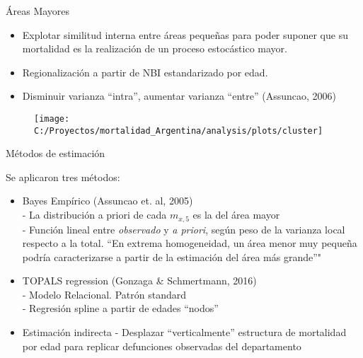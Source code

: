 \documentclass[10pt,ignorenonframetext,]{beamer}
\providecommand{\tightlist}{%
  \setlength{\itemsep}{0pt}\setlength{\parskip}{0pt}}
\begin{document}
\begin{frame}{Áreas Mayores}

\begin{itemize}[<+->]
\tightlist
\item
  Explotar similitud interna entre áreas pequeñas para poder suponer que
  su mortalidad es la realización de un proceso estocástico mayor.
\item
  Regionalización a partir de NBI estandarizado por edad.
\item
  Disminuir varianza ``intra'', aumentar varianza ``entre'' (Assuncao,
  2006)
\end{itemize}

\pause

\begin{figure}

{\centering \texttt{[image: C:/Proyectos/mortalidad\_Argentina/analysis/plots/cluster]} 

}

\end{figure}

\end{frame}

\begin{frame}{Métodos de estimación}

Se aplicaron tres métodos:

\begin{itemize}[<+->]
\tightlist
\item
  Bayes Empírico (Assuncao et. al, 2005)\\
  - La distribución a priori de cada \(m_{x,5}\) es la del área mayor\\
  - Función lineal entre \emph{observado} y \emph{a priori}, según peso
  de la varianza local respecto a la total. ``En extrema homogeneidad,
  un área menor muy pequeña podría caracterizarse a partir de la
  estimación del área más grande''"\\
\item
  TOPALS regression (Gonzaga \& Schmertmann, 2016)\\
  - Modelo Relacional. Patrón standard\\
  - Regresión spline a partir de edades ``nodos''\\
\item
  Estimación indirecta - Desplazar ``verticalmente'' estructura de
  mortalidad por edad para replicar defunciones observadas del
  departamento
\end{itemize}

\end{frame}
\end{document}
